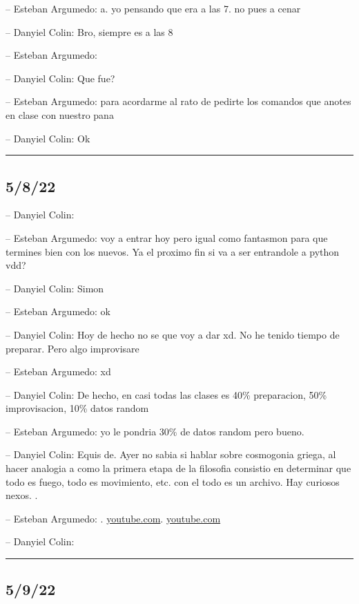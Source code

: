 -- Esteban Argumedo: a. yo pensando que era a las 7. no pues a cenar

-- Danyiel Colin: Bro, siempre es a las 8

-- Esteban Argumedo:

-- Danyiel Colin: Que fue?

-- Esteban Argumedo: para acordarme al rato de pedirte los comandos que
anotes en clase con nuestro pana

-- Danyiel Colin: Ok

\begin{center}\rule{0.5\linewidth}{0.5pt}\end{center}

\hypertarget{section-72}{%
\subsection{5/8/22}\label{section-72}}

-- Danyiel Colin:

-- Esteban Argumedo: voy a entrar hoy pero igual como fantasmon para que
termines bien con los nuevos. Ya el proximo fin si va a ser entrandole a
python vdd?

-- Danyiel Colin: Simon

-- Esteban Argumedo: ok

-- Danyiel Colin: Hoy de hecho no se que voy a dar xd. No he tenido
tiempo de preparar. Pero algo improvisare

-- Esteban Argumedo: xd

-- Danyiel Colin: De hecho, en casi todas las clases es 40\%
preparacion, 50\% improvisacion, 10\% datos random

-- Esteban Argumedo: yo le pondria 30\% de datos random pero bueno.

-- Danyiel Colin: Equis de. Ayer no sabia si hablar sobre cosmogonia
griega, al hacer analogia a como la primera etapa de la filosofia
consistio en determinar que todo es fuego, todo es movimiento, etc. con
el todo es un archivo. Hay curiosos nexos. .

-- Esteban Argumedo: .
\href{https://www.youtube.com/watch?v=R_Ud-FxUw0g\&t=2s}{youtube.com}.
\href{https://www.youtube.com/watch?v=jrKu24uFSsg}{youtube.com}

-- Danyiel Colin:

\begin{center}\rule{0.5\linewidth}{0.5pt}\end{center}

\hypertarget{section-73}{%
\subsection{5/9/22}\label{section-73}}

